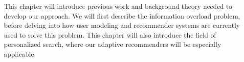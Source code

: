 \label{chap:theory}

This chapter will introduce previous work and background theory needed to develop our approach.
We will first describe the information overload problem, before delving into
how user modeling and recommender systems are currently used to solve this problem.
This chapter will also introduce the field of personalized search, 
where our adaptive recommenders will be especially applicable.








 
%


